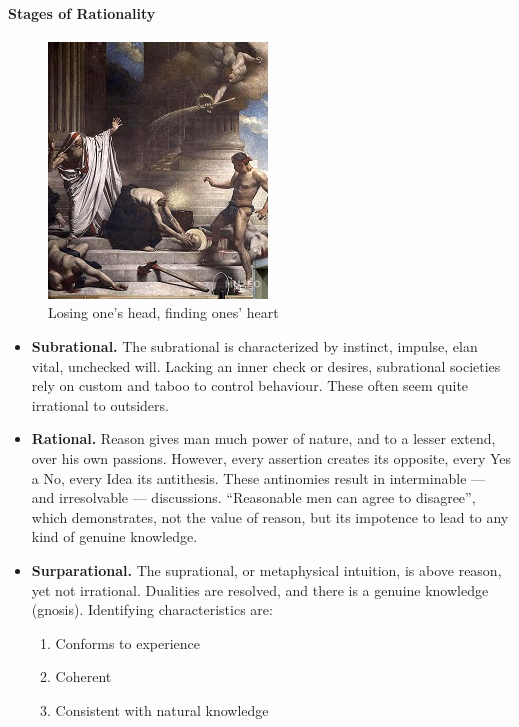 \paragraph{Stages of Rationality}
\begin{figure}
 \includegraphics[scale=.7]{a20201222NotestoOrientalMetaphysics-img001.jpg} 
\caption{Losing one's head, finding ones' heart}
\end{figure}

\begin{itemize}
\item \textbf{Subrational.} The subrational is characterized by instinct, impulse, elan vital, unchecked will. Lacking an inner check or desires, subrational societies rely on custom and taboo to control behaviour. These often seem quite irrational to outsiders. 
\item \textbf{Rational.} Reason gives man much power of nature, and to a lesser extend, over his own passions. However, every assertion creates its opposite, every Yes a No, every Idea its antithesis. These antinomies result in interminable — and irresolvable — discussions. “Reasonable men can agree to disagree”, which demonstrates, not the value of reason, but its impotence to lead to any kind of genuine knowledge. 
\item \textbf{Surparational.} The suprational, or metaphysical intuition, is above reason, yet not irrational. Dualities are resolved, and there is a genuine knowledge (gnosis). Identifying characteristics are: 

\begin{enumerate}
\item Conforms to experience 
\item Coherent 
\item Consistent with natural knowledge 
\end{enumerate}
\end{itemize}
